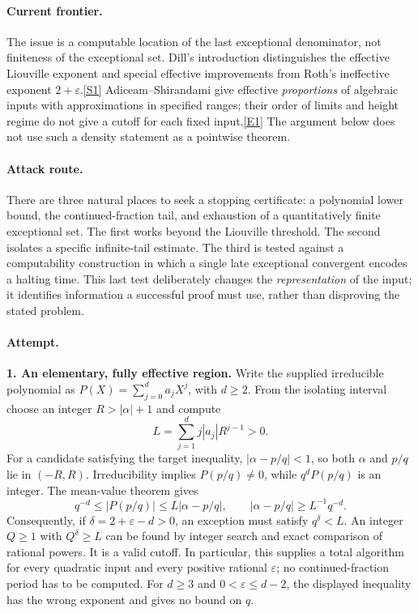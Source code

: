\documentclass[11pt,a4paper]{article}
\newcommand{\eps}{\varepsilon}
\newcommand{\sref}[2]{\hyperlink{source:#1:#2}{[S#2]}}
\newcommand{\eref}[2]{\hyperlink{extra:#1:#2}{[E#2]}}
\begin{document}
\paragraph{Current frontier.}
The issue is a computable location of the last exceptional denominator, not
finiteness of the exceptional set. Dill's introduction distinguishes the
effective Liouville exponent and special effective improvements from Roth's
ineffective exponent $2+\eps$.\sref{208}{1} Adiceam--Shirandami give effective
\emph{proportions} of algebraic inputs with approximations in specified
ranges; their order of limits and height regime do not give a cutoff for
each fixed input.\eref{208}{1} The argument below does not use such a density
statement as a pointwise theorem.

\paragraph{Attack route.}
There are three natural places to seek a stopping certificate: a polynomial
lower bound, the continued-fraction tail, and exhaustion of a quantitatively
finite exceptional set. The first works beyond the Liouville threshold.
The second isolates a specific infinite-tail estimate. The third is tested
against a computability construction in which a single late exceptional
convergent encodes a halting time. This last test deliberately changes the
\emph{representation} of the input; it identifies information a successful
proof must use, rather than disproving the stated problem.

\paragraph{Attempt.}
\textbf{1. An elementary, fully effective region.}
Write the supplied irreducible polynomial as
$P(X)=\sum_{j=0}^{d}a_jX^j$, with $d\ge2$.
From the isolating interval choose an integer $R>|\alpha|+1$ and compute
\[
 L=\sum_{j=1}^{d}j|a_j|R^{j-1}>0.
\]
For a candidate satisfying the target inequality, $|\alpha-p/q|<1$,
so both $\alpha$ and $p/q$ lie in $(-R,R)$. Irreducibility implies
$P(p/q)\ne0$, while $q^dP(p/q)$ is an integer. The mean-value theorem gives
\begin{equation}\label{208:liouville}
 q^{-d}\le |P(p/q)|\le L|\alpha-p/q|,
 \qquad |\alpha-p/q|\ge L^{-1}q^{-d}.
\end{equation}
Consequently, if $\delta=2+\eps-d>0$, an exception must satisfy
$q^\delta<L$. An integer $Q\ge1$ with $Q^\delta\ge L$ can be found by
integer search and exact comparison of rational powers. It is a valid
cutoff. In particular, this supplies a total algorithm for every quadratic
input and every positive rational $\eps$; no continued-fraction period has
to be computed. For $d\ge3$ and $0<\eps\le d-2$, the displayed inequality
has the wrong exponent and gives no bound on $q$.
\end{document}
